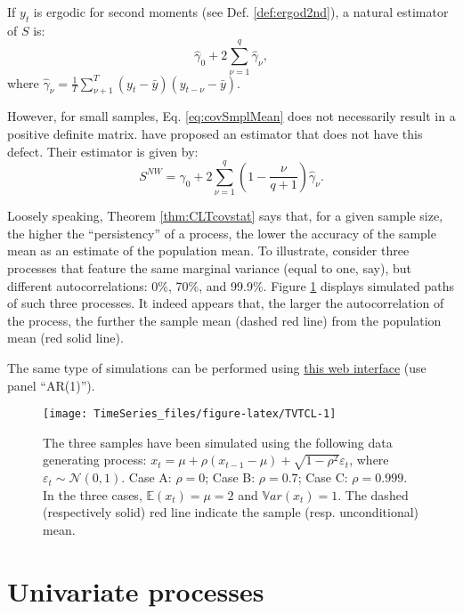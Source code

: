 \documentclass[
  12pt,
]{book}
\theoremstyle{definition}
\theoremstyle{definition}
\theoremstyle{definition}
\theoremstyle{definition}
\theoremstyle{remark}
\begin{document}
If \(y_t\) is ergodic for second moments (see Def. \ref{def:ergod2nd}), a natural estimator of \(S\) is:
\begin{equation}
\hat\gamma_0 + 2 \sum_{\nu=1}^{q} \hat\gamma_\nu, \label{eq:covSmplMean}
\end{equation}
where \(\hat\gamma_\nu = \frac{1}{T}\sum_{\nu+1}^{T} (y_t - \bar{y})(y_{t-\nu} - \bar{y})\).

However, for small samples, Eq. \eqref{eq:covSmplMean} does not necessarily result in a positive definite matrix. \citet{Newey_West_1987} have proposed an estimator that does not have this defect. Their estimator is given by:
\begin{equation}
S^{NW}=\hat\gamma_0 + 2 \sum_{\nu=1}^{q}\left(1-\frac{\nu}{q+1}\right) \hat\gamma_\nu.\label{eq:NWest}
\end{equation}

Loosely speaking, Theorem \ref{thm:CLTcovstat} says that, for a given sample size, the higher the ``persistency'' of a process, the lower the accuracy of the sample mean as an estimate of the population mean. To illustrate, consider three processes that feature the same marginal variance (equal to one, say), but different autocorrelations: 0\%, 70\%, and 99.9\%. Figure \ref{fig:TVTCL} displays simulated paths of such three processes. It indeed appears that, the larger the autocorrelation of the process, the further the sample mean (dashed red line) from the population mean (red solid line).

The same type of simulations can be performed using \href{https://jrenne.shinyapps.io/MacroEc/}{this web interface} (use panel ``AR(1)'').

\begin{figure}
\texttt{[image: TimeSeries\_files/figure-latex/TVTCL-1]} \caption{The three samples have been simulated using the following data generating process: $x_t = \mu + \rho (x_{t-1}-\mu) + \sqrt{1-\rho^2}\varepsilon_t$, where $\varepsilon_t \sim \mathcal{N}(0,1)$. Case A: $\rho = 0$;  Case B: $\rho = 0.7$;  Case C: $\rho = 0.999$. In the three cases, $\mathbb{E}(x_t)=\mu=2$ and $\mathbb{V}ar(x_t)=1$. The dashed (respectively solid) red line indicate the sample (resp. unconditional) mean.}\label{fig:TVTCL}
\end{figure}

\hypertarget{Univariate}{%
\chapter{Univariate processes}\label{Univariate}}
\end{document}
